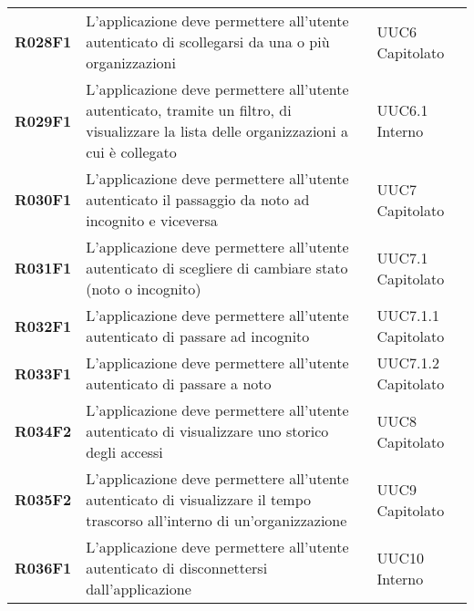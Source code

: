 \documentclass[../analisi-dei-requisiti.tex]{subfiles}
\begin{document}
\begin{center}
\begin{longtable}[H]{>{\centering\bfseries}m{3cm} >{\centering}m{10cm} >{\centering\arraybackslash}m{3cm}}
  R028F1                               & L'applicazione deve permettere all'utente autenticato di scollegarsi da una o più organizzazioni                                                                                                        & UUC6 Capitolato               \\
  R029F1                               & L'applicazione deve permettere all'utente autenticato, tramite un filtro, di visualizzare la lista delle organizzazioni a cui è collegato                                                               & UUC6.1 Interno                \\

  R030F1                               & L'applicazione deve permettere all'utente autenticato il passaggio da noto ad incognito e viceversa                                                                                                     & UUC7 Capitolato               \\
  R031F1                               & L'applicazione deve permettere all'utente autenticato di scegliere di cambiare stato (noto o incognito)                                                                                                 & UUC7.1 Capitolato             \\
  R032F1                               & L'applicazione deve permettere all'utente autenticato di passare ad incognito                                                                                                                           & UUC7.1.1 Capitolato           \\
  R033F1                               & L'applicazione deve permettere all'utente autenticato di passare a noto                                                                                                                                 & UUC7.1.2 Capitolato           \\
  R034F2                               & L'applicazione deve permettere all'utente autenticato di visualizzare uno storico degli accessi                                                                                                         & UUC8 Capitolato               \\
  R035F2                               & L'applicazione deve permettere all'utente autenticato di visualizzare il tempo trascorso all'interno di un'organizzazione                                                                               & UUC9 Capitolato               \\
  R036F1                               & L'applicazione deve permettere all'utente autenticato di disconnettersi dall'applicazione                                                                                                               & UUC10 Interno                 \\

\end{longtable}
\end{center}
\end{document}

